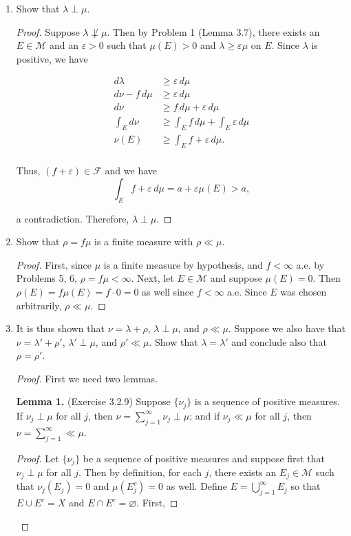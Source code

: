 \documentclass[11pt,oneside,english]{amsart}
\theoremstyle{definition}
\newcommand{\ve}{\varepsilon}
\newcommand{\MC}[1]{\mathcal{#1}}
\begin{document}
\begin{enumerate}
\item Show that $\lambda\perp\mu$.

\begin{proof}
Suppose $\lambda\not\perp\mu$. Then by Problem 1 (Lemma 3.7), there exists an $E\in\MC{M}$ and an $\ve>0$ such that $\mu(E)>0$ and $\lambda\geq\ve\mu$ on $E$. Since $\lambda$ is positive, we have

\begin{align*}
d\lambda&\geq\ve \,d\mu\\[2mm]
d\nu-f\,d\mu&\geq \ve\,d\mu\\[2mm]
d\nu&\geq f\,d\mu+\ve\,d\mu\\[2mm]
\int_E d\nu&\geq \int_E f\,d\mu+\int_E\ve\,d\mu\\[2mm]
\nu(E)&\geq \int_Ef+\ve\,d\mu.\\[2mm]
\end{align*}

\vspace{-5mm}
Thus, $(f+\ve)\in\MC{F}$ and we have
\[
\int_E f+\ve\,d\mu=a+\ve\mu(E)> a,
\]

a contradiction. Therefore, $\lambda\perp\mu$.
\end{proof}

\pagebreak

\item Show that $\rho=f\mu$ is a finite measure with $\rho\ll\mu$.

\begin{proof}
First, since $\mu$ is a finite measure by hypothesis, and $f<\infty$ a.e. by Problems 5, 6, $\rho=f\mu<\infty$. Next, let $E\in\MC{M}$ and suppose $\mu(E)=0$. Then $\rho(E)=f\mu(E)=f\cdot0=0$ as well since $f<\infty$ a.e. Since $E$ was chosen arbitrarily, $\rho\ll\mu$. 
\end{proof}

\item It is thus shown that $\nu=\lambda+\rho$, $\lambda\perp\mu$, and $\rho\ll\mu$. Suppose we also have that $\nu=\lambda'+\rho'$, $\lambda'\perp\mu$, and $\rho'\ll\mu$. Show that $\lambda=\lambda'$ and conclude also that $\rho=\rho'$.

\begin{proof}
First we need two lemmas.

\textbf{Lemma 1.} (Exercise 3.2.9) Suppose $\{\nu_j\}$ is a sequence of positive measures. If $\nu_j\perp\mu$ for all $j$, then $\nu=\sum_{j=1}^\infty\nu_j\perp\mu$; and if $\nu_j\ll\mu$ for all $j$, then $\nu=\sum_{j=1}^\infty\ll\mu$.

\begin{proof}
Let $\{\nu_j\}$ be a sequence of positive measures and suppose first that $\nu_j\perp\mu$ for all $j$. Then by definition, for each $j$,  there exists an $E_j\in\MC{M}$ such that $\nu_j(E_j)=0$ and  $\mu(E_j^c)=0$ as well. Define $E=\bigcup_{j=1}^\infty E_j$ so that $E\cup E^c=X$ and $E\cap E^c=\varnothing$. First, 


\end{proof}
\end{proof}
\end{enumerate}
\end{document}
